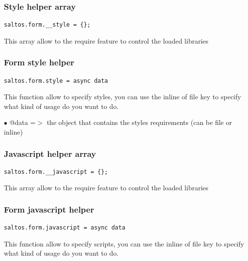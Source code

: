 \documentclass[a4paper]{article}
\begin{document}
\hypertarget{toc227}{}
\subsubsection{Style helper array}

\begin{lstlisting}
saltos.form.__style = {};
\end{lstlisting}

This array allow to the require feature to control the loaded libraries

\hypertarget{toc228}{}
\subsubsection{Form style helper}

\begin{lstlisting}
saltos.form.style = async data
\end{lstlisting}

This function allow to specify styles, you can use the inline of file key to specify
what kind of usage do you want to do.

\begin{compactitem}
\item[\color{myblue}$\bullet$] @data =$>$ the object that contains the styles requirements (can be file or inline)
\end{compactitem}

\hypertarget{toc229}{}
\subsubsection{Javascript helper array}

\begin{lstlisting}
saltos.form.__javascript = {};
\end{lstlisting}

This array allow to the require feature to control the loaded libraries

\hypertarget{toc230}{}
\subsubsection{Form javascript helper}

\begin{lstlisting}
saltos.form.javascript = async data
\end{lstlisting}

This function allow to specify scripts, you can use the inline of file key to specify
what kind of usage do you want to do.
\end{document}
